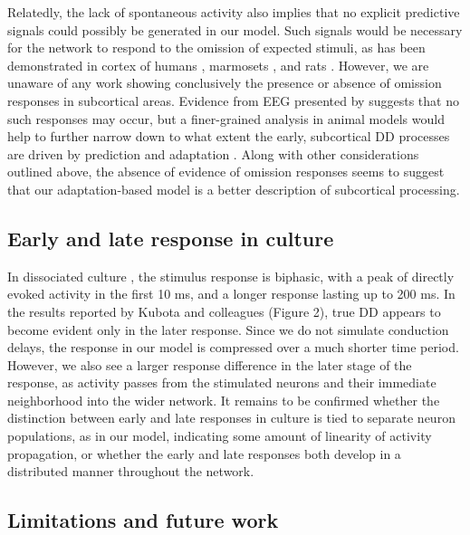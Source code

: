 \documentclass[9pt,lineno,onehalfspacing]{elife}
\begin{document}
Relatedly, the lack of spontaneous activity also implies that no explicit predictive signals could possibly be generated in our model. Such signals would be necessary for the network to respond to the omission of expected stimuli, as has been demonstrated in cortex of humans \citep{Lehmann2016-ol, Demarchi2019-ch}, marmosets \citep{Jiang2022-ak}, and rats \citep{Auksztulewicz2022-gq}. However, we are unaware of any work showing conclusively the presence or absence of omission responses in subcortical areas. Evidence from EEG presented by \cite{Lehmann2016-ol} suggests that no such responses may occur, but a finer-grained analysis in animal models would help to further narrow down to what extent the early, subcortical DD processes are driven by prediction and adaptation \citep{Schlossmacher2022-zv}. Along with other considerations outlined above, the absence of evidence of omission responses seems to suggest that our adaptation-based model is a better description of subcortical processing.

\subsection{Early and late response in culture}

In dissociated culture \citep{Kubota2021-dx}, the stimulus response is biphasic, with a peak of directly evoked activity in the first 10 ms, and a longer response lasting up to 200 ms. In the results reported by Kubota and colleagues (Figure 2), true DD appears to become evident only in the later response. Since we do not simulate conduction delays, the response in our model is compressed over a much shorter time period. However, we also see a larger response difference in the later stage of the response, as activity passes from the stimulated neurons and their immediate neighborhood into the wider network. It remains to be confirmed whether the distinction between early and late responses in culture is tied to separate neuron populations, as in our model, indicating some amount of linearity of activity propagation, or whether the early and late responses both develop in a distributed manner throughout the network.

\subsection{Limitations and future work}
\end{document}
